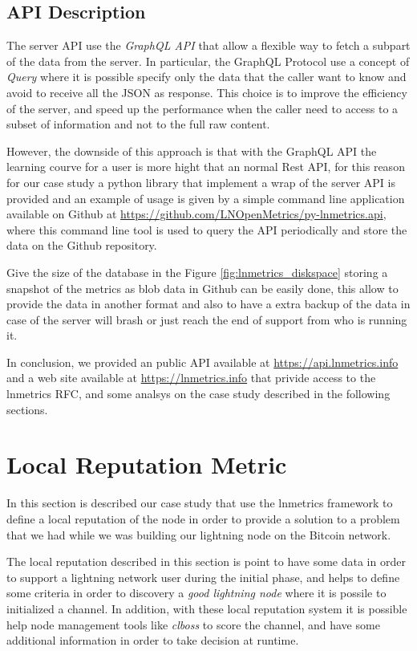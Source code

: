 \subsection{API Description}

The server API use the \emph{GraphQL API} that allow a flexible way to fetch
a subpart of the data from the server. In particular, the GraphQL Protocol use
a concept of \emph{Query} where it is possible specify only the data that the 
caller want to know and avoid to receive all the JSON as response. This choice is to
improve the efficiency of the server, and speed up the performance when the caller need 
to access to a subset of information and not to the full raw content. 

However, the downside of this approach is that with the GraphQL API the learning 
courve for a user is more hight that an normal Rest API, for this reason for our
case study a python library that implement a wrap of the server API is provided 
and an example of usage is given by a simple command line application 
available on Github at \url{https://github.com/LNOpenMetrics/py-lnmetrics.api}, 
where this command line tool is used to query the API periodically 
and store the data on the Github repository. 

Give the size of the database in the Figure \ref{fig:lnmetrics_diskspace}
storing a snapshot of the metrics as blob data in Github can be easily done, this allow 
to provide the data in another format and also to have a extra backup of the data 
in case of the server will brash or just reach the end of support from who is running it.

In conclusion, we provided an public API available at \url{https://api.lnmetrics.info} and 
a web site available at \url{https://lnmetrics.info} that privide access to the 
lnmetrics RFC, and some analsys on the case study described in the 
following sections.

\section{Local Reputation Metric}
\label{sec:demo}

In this section is described our case study that use the lnmetrics framework to 
define a local reputation of the node in order to provide a solution to a problem 
that we had while we was building our lightning node on the Bitcoin network.

The local reputation described in this section is point to have some data 
in order to support a lightning network user during the initial phase, and 
helps to define some criteria in order to discovery a \emph{good lightning node} 
where it is possile to initialized a channel. In addition, with these local reputation 
system it is possible help node management tools like \emph{clboss}\cite{clboss}
to score the channel, and have some additional information in order to 
take decision at runtime.

